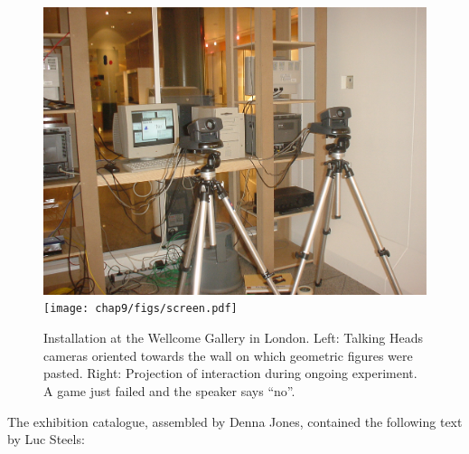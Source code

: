\begin{figure}[htbp]
 \centerline{
  \includegraphics[width=.55\textwidth]{chap9/figs/london-heads.pdf} 
\texttt{[image: chap9/figs/screen.pdf]}
}
\caption{Installation at the Wellcome Gallery in London. Left: Talking Heads cameras oriented towards the wall on which 
geometric figures were pasted. Right: Projection of interaction during ongoing experiment. A game just failed and 
the speaker says ``no''.} 
\label{fig:london-heads}
\end{figure}

The exhibition catalogue, assembled by Denna Jones, contained the following text by Luc Steels: 

